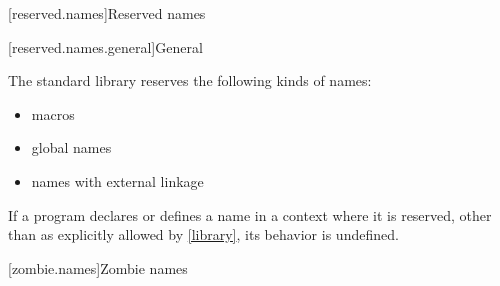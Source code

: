 [reserved.names]{Reserved names}%

[reserved.names.general]{General}%

\pnum
The \Cpp{} standard library reserves the following kinds of names:
\begin{itemize}
\item macros
\item global names
\item names with external linkage
\end{itemize}

\pnum
If a program declares or defines a name in a context where it is
reserved, other than as explicitly allowed by \ref{library}, its behavior is
undefined.%

[zombie.names]{Zombie names}%
%
%
%

